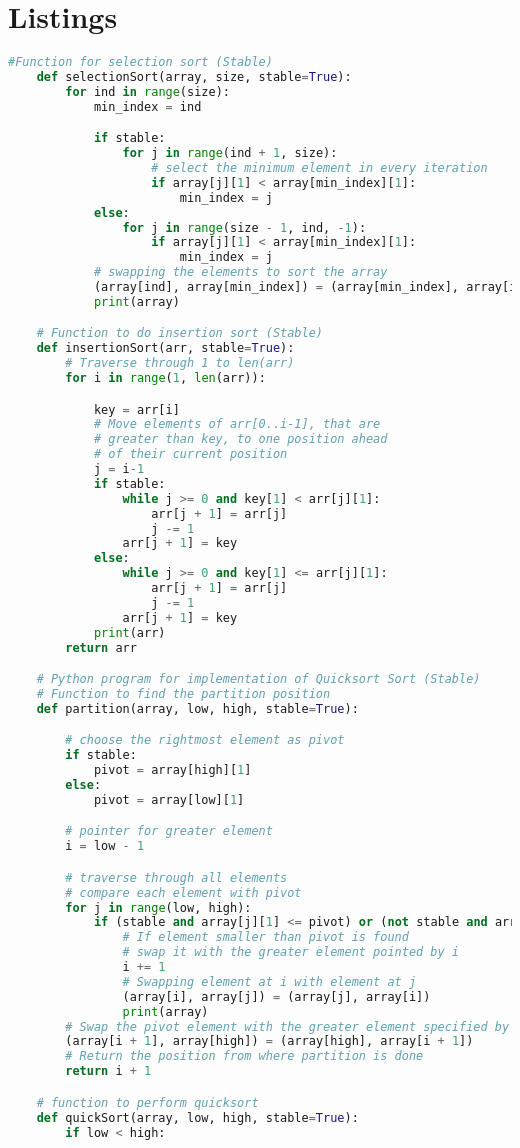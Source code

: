 \documentclass{report}
\begin{document}
\section{Listings}
\begin{lstlisting}[language=python]
	#Function for selection sort (Stable)
	def selectionSort(array, size, stable=True):
		for ind in range(size):
			min_index = ind

			if stable:
				for j in range(ind + 1, size):
					# select the minimum element in every iteration
					if array[j][1] < array[min_index][1]:
						min_index = j
			else:
				for j in range(size - 1, ind, -1):
					if array[j][1] < array[min_index][1]:
						min_index = j
			# swapping the elements to sort the array
			(array[ind], array[min_index]) = (array[min_index], array[ind])
			print(array)

	# Function to do insertion sort (Stable)
	def insertionSort(arr, stable=True):
		# Traverse through 1 to len(arr)
		for i in range(1, len(arr)):

			key = arr[i]
			# Move elements of arr[0..i-1], that are
			# greater than key, to one position ahead
			# of their current position
			j = i-1
			if stable:
				while j >= 0 and key[1] < arr[j][1]:
					arr[j + 1] = arr[j]
					j -= 1
				arr[j + 1] = key
			else:
				while j >= 0 and key[1] <= arr[j][1]:
					arr[j + 1] = arr[j]
					j -= 1
				arr[j + 1] = key
			print(arr)
		return arr

	# Python program for implementation of Quicksort Sort (Stable)
	# Function to find the partition position
	def partition(array, low, high, stable=True):

		# choose the rightmost element as pivot
		if stable:
			pivot = array[high][1]
		else:
			pivot = array[low][1]

		# pointer for greater element
		i = low - 1

		# traverse through all elements
		# compare each element with pivot
		for j in range(low, high):
			if (stable and array[j][1] <= pivot) or (not stable and array[j][1] < pivot):
				# If element smaller than pivot is found
				# swap it with the greater element pointed by i
				i += 1
				# Swapping element at i with element at j
				(array[i], array[j]) = (array[j], array[i])
				print(array)
		# Swap the pivot element with the greater element specified by i
		(array[i + 1], array[high]) = (array[high], array[i + 1])
		# Return the position from where partition is done
		return i + 1

	# function to perform quicksort
	def quickSort(array, low, high, stable=True):
		if low < high:


\end{lstlisting}
\end{document}
